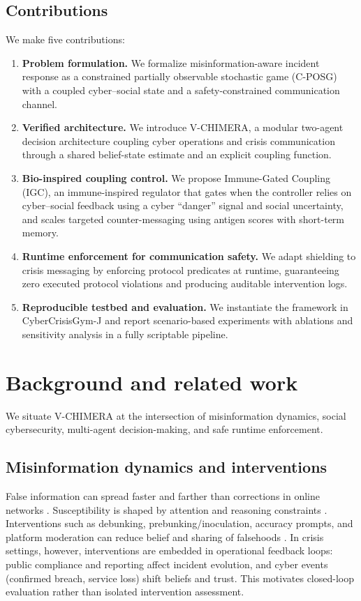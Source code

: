\documentclass[biomimetics,article,submit,pdftex,moreauthors]{Definitions/mdpi}
\newcommand{\model}{V-CHIMERA}
\newcommand{\igc}{Immune-Gated Coupling (IGC)}
\newcommand{\envname}{CyberCrisisGym-J}
\begin{document}
\subsection{Contributions}
We make five contributions:
\begin{enumerate}[leftmargin=*]
  \item \textbf{Problem formulation.} We formalize misinformation-aware incident response as a constrained partially observable stochastic game (C-POSG) with a coupled cyber--social state and a safety-constrained communication channel.
  \item \textbf{Verified architecture.} We introduce \model{}, a modular two-agent decision architecture coupling cyber operations and crisis communication through a shared belief-state estimate and an explicit coupling function.
  \item \textbf{Bio-inspired coupling control.} We propose \igc{}, an immune-inspired regulator that gates when the controller relies on cyber--social feedback using a cyber ``danger'' signal and social uncertainty, and scales targeted counter-messaging using antigen scores with short-term memory.
  \item \textbf{Runtime enforcement for communication safety.} We adapt shielding to crisis messaging by enforcing protocol predicates at runtime, guaranteeing zero executed protocol violations and producing auditable intervention logs.
  \item \textbf{Reproducible testbed and evaluation.} We instantiate the framework in \envname{} and report scenario-based experiments with ablations and sensitivity analysis in a fully scriptable pipeline.
\end{enumerate}

\section{Background and related work}
We situate \model{} at the intersection of misinformation dynamics, social cybersecurity, multi-agent decision-making, and safe runtime enforcement.

\subsection{Misinformation dynamics and interventions}
False information can spread faster and farther than corrections in online networks \citep{vosoughi2018spread,lazer2018science}. Susceptibility is shaped by attention and reasoning constraints \citep{pennycook2019lazy}. Interventions such as debunking, prebunking/inoculation, accuracy prompts, and platform moderation can reduce belief and sharing of falsehoods \citep{kozyreva2024toolbox,lewandowsky2021inoculation,ng2021platform}. In crisis settings, however, interventions are embedded in operational feedback loops: public compliance and reporting affect incident evolution, and cyber events (confirmed breach, service loss) shift beliefs and trust. This motivates closed-loop evaluation rather than isolated intervention assessment.
\end{document}
